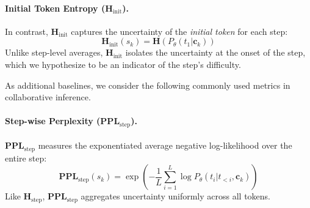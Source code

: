 \documentclass[11pt]{article}
\newcommand{\todoc}[2]{{\textcolor{#1}{{[#2]}}}}
\newcommand{\todoviolet}[1]{\todoc{violet}{\textbf{#1}}}
\newcommand{\zeng}[1]{\textcolor[rgb]{1,0.66,0}{\textbf{[Zeng: #1]}}}
\newcommand{\shi}[1]{\todoviolet{Shi: #1}}
\begin{document}
\paragraph{Initial Token Entropy ($\mathbf{H}_\text{init}$).} In contrast, \(\mathbf{H}_\text{init}\) captures the uncertainty of the \emph{initial token} for each step:
\begin{equation}
    \mathbf{H}_\text{init}(s_k) = \mathbf{H}(P_\theta(t_1 | \mathbf{c}_k))
\end{equation}
Unlike step-level averages, $\mathbf{H}_\text{init}$ isolates the uncertainty at the onset of the step, which we hypothesize to be an indicator of the step’s difficulty.



As additional baselines, we consider the following commonly used metrics in collaborative inference.

\paragraph{Step-wise Perplexity ($\mathbf{PPL}_\text{step}$).} $\mathbf{PPL}_\text{step}$ measures the exponentiated average negative log-likelihood over the entire step:
\begin{equation}
    \mathbf{PPL}_\text{step}(s_k) = \exp\left( -\frac{1}{L} \sum_{i=1}^{L} \log P_\theta(t_i | t_{<i}, \mathbf{c}_k) \right)
\end{equation}
Like $\mathbf{H}_\text{step}$, $\mathbf{PPL}_\text{step}$ aggregates uncertainty uniformly across all tokens.
\end{document}
